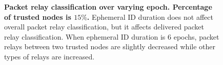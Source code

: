 \documentclass[11pt]{article}
\begin{document}
\begin{figure}[h!]
{\label{fig:delivered_relay_classification_epoch_6}
}
{}

\caption{{\bf Packet relay classification over varying epoch. Percentage of trusted nodes is $15\%$.}
Ephemeral ID duration does not affect overall packet relay classification, but it affects delivered packet relay classification.  
When ephemeral ID duration is 6 epochs, packet relays between two trusted nodes are slightly decreased while other types of relays are increased. 
}
\label{fig:relay_classification_epoch}
\end{figure}
\end{document}
